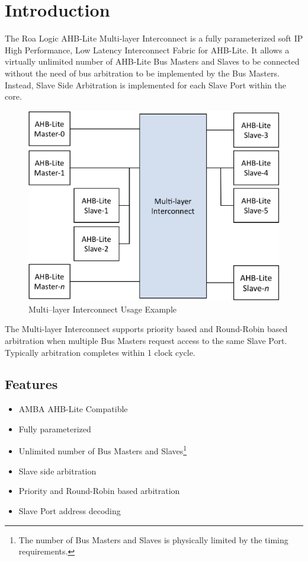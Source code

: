 \chapter{Introduction}\label{introduction}

The Roa Logic AHB-Lite Multi-layer Interconnect is a fully parameterized
soft IP High Performance, Low Latency Interconnect Fabric for AHB-Lite.
It allows a virtually unlimited number of AHB-Lite Bus Masters and
Slaves to be connected without the need of bus arbitration to be
implemented by the Bus Masters. Instead, Slave Side Arbitration is
implemented for each Slave Port within the core.

\begin{figure}[tbh]
  \centering
  \includegraphics{assets/img/ahb-lite-switch-sys}
  \caption{Multi--layer Interconnect Usage Example}
  \label{fig:ahb-lite-switch-sys}
\end{figure}


The Multi-layer Interconnect supports priority based and Round-Robin based
arbitration when multiple Bus Masters request access to the same Slave
Port. Typically arbitration completes within 1 clock cycle.

\section{Features}\label{features}

\begin{itemize}
\item
  AMBA AHB-Lite Compatible
\item
  Fully parameterized
\item
  Unlimited number of Bus Masters and Slaves\footnote{The number of Bus
    Masters and Slaves is physically limited by the timing requirements.}
\item
  Slave side arbitration
\item
  Priority and Round-Robin based arbitration
\item
  Slave Port address decoding
\end{itemize}
